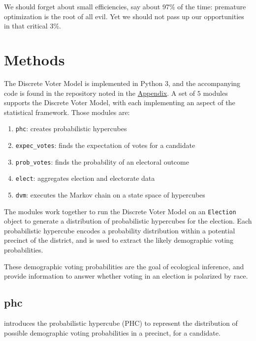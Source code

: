 \begin{savequote}[75mm]
  We should forget about small efficiencies, say about 97\% of the time: premature optimization is the root of all evil. Yet we should not pass up our opportunities in that critical 3\%.
\end{savequote}

\chapter{Methods}

The Discrete Voter Model is implemented in Python 3, and the accompanying code is found in the repository noted in the \hyperref[chap:appendix]{Appendix}. A set of $5$ modules supports the Discrete Voter Model, with each implementing an aspect of the statistical framework. Those modules are:

\begin{enumerate}
  \item \texttt{phc}: creates probabilistic hypercubes
  \item \texttt{expec\_votes}: finds the expectation of votes for a candidate
  \item \texttt{prob\_votes}: finds the probability of an electoral outcome
  \item \texttt{elect}: aggregates election and electorate data
  \item \texttt{dvm}: executes the Markov chain on a state space of hypercubes
\end{enumerate}

The modules work together to run the Discrete Voter Model on an \texttt{Election} object to generate a distribution of probabilistic hypercubes for the election. Each probabilistic hypercube encodes a probability distribution within a potential precinct of the district, and is used to extract the likely demographic voting probabilities.

These demographic voting probabilities are the goal of ecological inference, and provide information to answer whether voting in an election is polarized by race.

\section{phc}
\label{sec:phc}

 introduces the probabilistic hypercube (PHC) to represent the distribution of possible demographic voting probabilities in a precinct, for a candidate.

